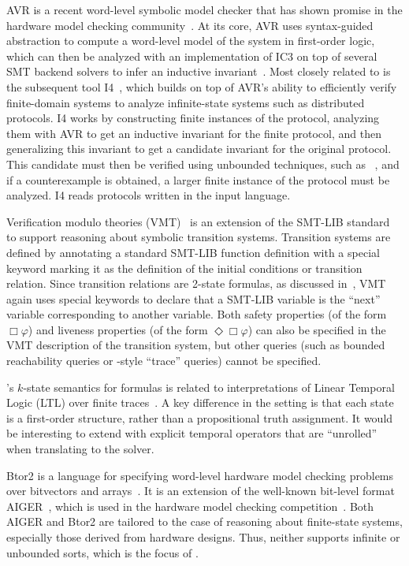 AVR is a recent word-level symbolic model checker
that has shown promise in the hardware model checking community~\cite{goel-avr}.
%
At its core, AVR uses syntax-guided abstraction to compute a
word-level model of the system in first-order logic,
which can then be analyzed with an implementation of IC3 on top of several SMT backend solvers
to infer an inductive invariant~\cite{bradley-ic3}.
%
Most closely related to \mypyvy is the subsequent tool I4~\cite{i4},
which builds on top of AVR's ability to efficiently verify finite-domain systems
to analyze infinite-state systems such as distributed protocols.
%
I4 works by constructing finite instances of the protocol,
analyzing them with AVR to get an inductive invariant for the finite protocol,
and then generalizing this invariant
to get a candidate invariant for the original protocol.
%
This candidate must then be verified using unbounded techniques,
such as \ivy~\cite{Padon-al:PLDI16},
and if a counterexample is obtained,
a larger finite instance of the protocol must be analyzed.
%
I4 reads protocols written in the \ivy input language.

Verification modulo theories (VMT)~\cite{nuxmv-user-manual,vmt-website}
is an extension of the SMT-LIB standard~\cite{smtlib-standard}
to support reasoning about symbolic transition systems.
%
Transition systems are defined by annotating a standard SMT-LIB function definition
with a special keyword marking it as the definition of the
initial conditions or transition relation.
%
Since transition relations are 2-state formulas,
as discussed in~,
VMT again uses special keywords to declare that a SMT-LIB variable is
the ``next'' variable corresponding to another variable.
%
Both safety properties (of the form $\Box\varphi$) and
liveness properties (of the form $\Diamond\Box\varphi$)
can also be specified in the VMT description of the transition system,
but other queries (such as bounded reachability queries or
\mypyvy-style ``trace'' queries) cannot be specified.

\mypyvy's $k$-state semantics for formulas is
related to interpretations of Linear Temporal Logic (LTL)
over finite traces~\cite{vardi-ltl-finite}.
%
A key difference in the \mypyvy setting is that
each state is a first-order structure,
rather than a propositional truth assignment.
%
It would be interesting to extend \mypyvy
with explicit temporal operators that are ``unrolled''
when translating to the solver.

Btor2 is a language for specifying word-level hardware model checking problems
over bitvectors and arrays~\cite{btor2}.
%
It is an extension of the well-known bit-level format AIGER~\cite{aiger-1.9},
which is used in the hardware model checking competition~\cite{hwmcc20}.
%
Both AIGER and Btor2 are tailored to the case of reasoning
about finite-state systems, especially those derived from hardware designs.
%
Thus, neither supports infinite or unbounded sorts,
which is the focus of \mypyvy.


